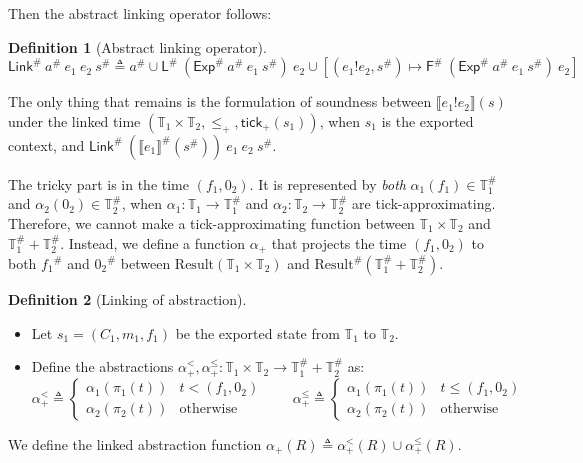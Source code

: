 \documentclass[acmsmall,review]{acmart}\settopmatter{printfolios=true,printccs=false,printacmref=false}
\theoremstyle{definition}
\newtheorem{definition}{Definition}[section]
\newcommand*{\A}[1]{{#1}^{\#}}
\newcommand*{\Time}{\mathbb{T}}
\newcommand*{\ATime}{\A{\Time}}
\newcommand*{\mem}{m}
\newcommand*{\Result}[1]{\text{Result}({#1})}
\newcommand*{\AResult}[1]{\A{\text{Result}}({#1})}
\newcommand*{\link}[2]{{#1}\mathtt{!}{#2}}
\newcommand*{\EE}{\mathsf{Exp}}
\newcommand*{\LL}{\mathsf{L}}
\newcommand*{\Link}{\mathsf{Link}}
\newcommand*{\sembracket}[1]{\lBrack{#1}\rBrack}
\newcommand*{\tick}{\mathsf{tick}}
\begin{document}
Then the abstract linking operator follows:
\begin{definition}[Abstract linking operator]
  \[
    \A\Link\:\A{a}\:e_1\:e_2\:\A{s}\triangleq\A{a}\cup\A\LL\:(\A\EE\:\A{a}\:e_1\:\A{s})\:e_2\cup[(\link{e_1}{e_2},\A{s})\mapsto\A{\mathsf{F}}\:(\A\EE\:\A{a}\:e_1\:\A{s})\:e_2]
  \]
\end{definition}

The only thing that remains is the formulation of soundness between $\sembracket{\link{e_1}{e_2}}(s)$ under the linked time $(\Time_1\times\Time_2,\le_+,\tick_{+}(s_1))$, when $s_1$ is the exported context,
and $\A\Link\:(\A{\sembracket{e_1}}(\A{s}))\:e_1\:e_2\:\A{s}$.

The tricky part is in the time $(f_1,0_2)$.
It is represented by \emph{both} $\alpha_1(f_1)\in\ATime_1$ and $\alpha_2(0_2)\in\ATime_2$, when $\alpha_1:\Time_1\rightarrow\ATime_1$ and $\alpha_2:\Time_2\rightarrow\ATime_2$ are tick-approximating.
Therefore, we cannot make a tick-approximating function between $\Time_1\times\Time_2$ and $\ATime_1+\ATime_2$.
Instead, we define a function $\alpha_+$ that projects the time $(f_1,0_2)$ to both $\A{f_1}$ and $\A{0_2}$ between $\Result{\Time_1\times\Time_2}$ and $\AResult{\ATime_1+\ATime_2}$.
\begin{definition}[Linking of abstraction]
  $\:$

  \begin{itemize}
    \item Let $s_1=(C_1,\mem_1,f_1)$ be the exported state from $\Time_1$ to $\Time_2$.
    \item Define the abstractions $\alpha^{<}_{+},\alpha^{\le}_{+}:\Time_1\times\Time_2\rightarrow\ATime_1+\ATime_2$ as:
          \[
            \alpha^{<}_{+}\triangleq
            \begin{cases}
              \alpha_1(\pi_1(t)) & t<(f_1,0_2)      \\
              \alpha_2(\pi_2(t)) & \text{otherwise}
            \end{cases}
            \qquad
            \alpha^{\le}_{+}\triangleq
            \begin{cases}
              \alpha_1(\pi_1(t)) & t\le(f_1,0_2)    \\
              \alpha_2(\pi_2(t)) & \text{otherwise}
            \end{cases}
          \]
  \end{itemize}
  We define the linked abstraction function $\alpha_+(R)\triangleq\alpha^{<}_+(R)\cup\alpha^{\le}_+(R)$.
\end{definition}
\end{document}

